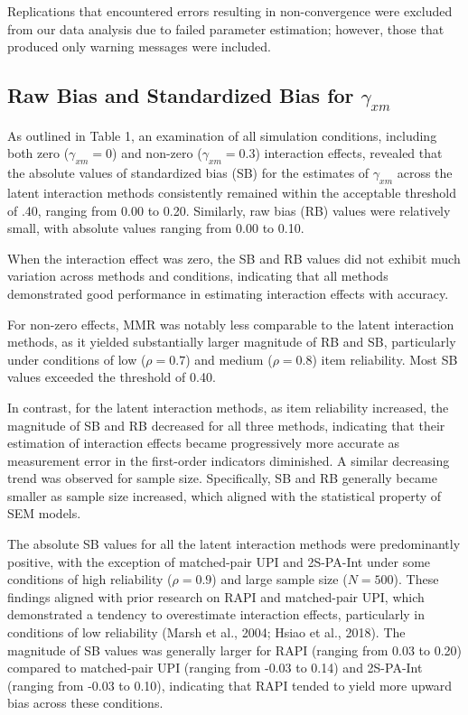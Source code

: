 \documentclass[
  man]{apa6}
\begin{document}
Replications that encountered errors resulting in non-convergence were excluded from our data analysis due to failed parameter estimation; however, those that produced only warning messages were included.

\subsection{\texorpdfstring{Raw Bias and Standardized Bias for \(\gamma_{xm}\)}{Raw Bias and Standardized Bias for \textbackslash gamma\_\{xm\}}}\label{raw-bias-and-standardized-bias-for-gamma_xm}

As outlined in Table 1, an examination of all simulation conditions, including both zero (\(\gamma_{xm} = 0\)) and non-zero (\(\gamma_{xm} = 0.3\)) interaction effects, revealed that the absolute values of standardized bias (SB) for the estimates of \(\gamma_{xm}\) across the latent interaction methods consistently remained within the acceptable threshold of .40, ranging from 0.00 to 0.20. Similarly, raw bias (RB) values were relatively small, with absolute values ranging from 0.00 to 0.10.

When the interaction effect was zero, the SB and RB values did not exhibit much variation across methods and conditions, indicating that all methods demonstrated good performance in estimating interaction effects with accuracy.

For non-zero effects, MMR was notably less comparable to the latent interaction methods, as it yielded substantially larger magnitude of RB and SB, particularly under conditions of low (\(\rho = 0.7\)) and medium (\(\rho = 0.8\)) item reliability. Most SB values exceeded the threshold of 0.40.

In contrast, for the latent interaction methods, as item reliability increased, the magnitude of SB and RB decreased for all three methods, indicating that their estimation of interaction effects became progressively more accurate as measurement error in the first-order indicators diminished. A similar decreasing trend was observed for sample size. Specifically, SB and RB generally became smaller as sample size increased, which aligned with the statistical property of SEM models.

The absolute SB values for all the latent interaction methods were predominantly positive, with the exception of matched-pair UPI and 2S-PA-Int under some conditions of high reliability (\(\rho = 0.9\)) and large sample size (\(\textit{N} = 500\)). These findings aligned with prior research on RAPI and matched-pair UPI, which demonstrated a tendency to overestimate interaction effects, particularly in conditions of low reliability (Marsh et al., 2004; Hsiao et al., 2018). The magnitude of SB values was generally larger for RAPI (ranging from 0.03 to 0.20) compared to matched-pair UPI (ranging from -0.03 to 0.14) and 2S-PA-Int (ranging from -0.03 to 0.10), indicating that RAPI tended to yield more upward bias across these conditions.
\end{document}
